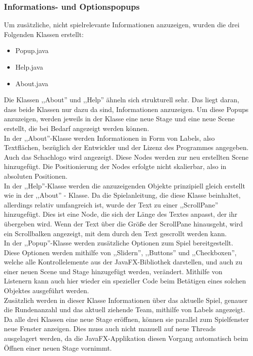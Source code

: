 \documentclass[12pt,a4paper]{article}
\begin{document}
\subsubsection{Informations- und Optionspopups}
\label{SUBSUBSEC:OPTIONS}
Um zusätzliche, nicht spielrelevante Informationen anzuzeigen, wurden die drei Folgenden Klassen erstellt: 
\begin{itemize}
\item{Popup.java}
\item{Help.java}
\item{About.java}
\end{itemize}
Die Klassen ,,About'' und ,,Help'' ähneln sich strukturell sehr. Das liegt daran, dass beide Klassen nur dazu da sind, Informationen anzuzeigen. Um diese Popups anzuzeigen, werden jeweils in der Klasse eine neue Stage und eine neue Scene erstellt, die bei Bedarf angezeigt werden können. \\
In der ,,About''-Klasse werden Informationen in Form von Labels, also Textflächen, bezüglich der Entwickler und der Lizenz des Programmes angegeben. Auch das Schachlogo wird angezeigt. Diese Nodes werden zur neu erstellten Scene hinzugefügt. Die Positionierung der Nodes erfolgte nicht skalierbar, also in absoluten Positionen.\\
In der ,,Help''-Klasse werden die anzuzeigenden Objekte prinzipiell gleich erstellt wie in der ,,About'' - Klasse. Da die Spielanleitung, die diese Klasse beinhaltet, allerdings relativ umfangreich ist, wurde der Text zu einer ,,ScrollPane'' hinzugefügt. Dies ist eine Node, die sich der Länge des Textes anpasst, der ihr übergeben wird. Wenn der Text über die Größe der ScrollPane hinausgeht, wird ein Scrollbalken angezeigt, mit dem durch den Text gescrollt werden kann. \\
In der ,,Popup''-Klasse werden zusätzliche Optionen zum Spiel bereitgestellt. Diese Optionen werden mithilfe von ,,Slidern'', ,,Buttons'' und ,,Checkboxen'', welche alle Kontrollelemente aus der JavaFX-Bibliothek darstellen, und auch zu einer neuen Scene und Stage hinzugefügt werden, verändert. 
Mithilfe von Listenern kann auch hier wieder ein spezieller Code beim Betätigen eines solchen Objektes ausgeführt werden.\\
Zusätzlich werden in dieser Klasse Informationen über das aktuelle Spiel, genauer die Rundenanzahl und das aktuell ziehende Team, mithilfe von Labels angezeigt. \\
Da alle drei Klassen eine neue Stage eröffnen, können sie parallel zum Spielfenster neue Fenster anzeigen. Dies muss auch nicht manuell auf neue Threads ausgelagert werden, da die JavaFX-Applikation diesen Vorgang automatisch beim Öffnen einer neuen Stage vornimmt. 
\end{document}
